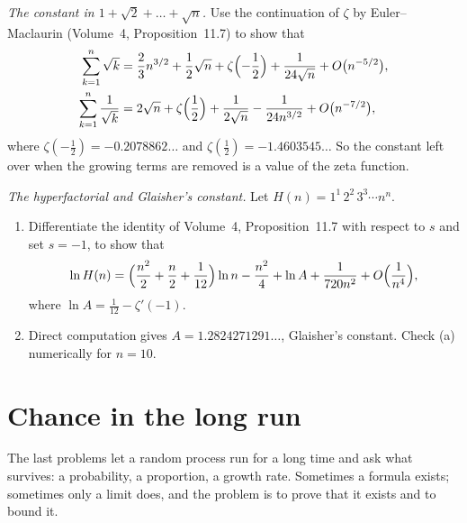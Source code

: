 \begin{exercise}[$\star\star$]\label{pb:sqrtsum}
\emph{The constant in $1+\sqrt2+\dots+\sqrt n$.} Use the continuation of $\zeta$ by Euler--Maclaurin (Volume~4, Proposition~11.7) to show that
\[
\begin{aligned}\sum_{k=1}^n\sqrt k&=\frac23n^{3/2}+\frac12\sqrt n+\zeta\Bigl(-\frac12\Bigr)+\frac1{24\sqrt n}+O\bigl(n^{-5/2}\bigr),\\
\sum_{k=1}^n\frac1{\sqrt k}&=2\sqrt n+\zeta\Bigl(\frac12\Bigr)+\frac1{2\sqrt n}-\frac1{24n^{3/2}}+O\bigl(n^{-7/2}\bigr),\end{aligned}
\]
where $\zeta(-\frac12)=-0.2078862\ldots$ and $\zeta(\frac12)=-1.4603545\ldots$ So the constant left over when the growing terms are removed is a value of the zeta function.
\end{exercise}

\begin{exercise}[$\star\star\star$]\label{pb:hyperfactorial}
\emph{The hyperfactorial and Glaisher's constant.} Let $H(n)=1^1\,2^2\,3^3\cdots n^n$.
\begin{enumerate}[label=(\alph*)]
\item Differentiate the identity of Volume~4, Proposition~11.7 with respect to $s$ and set $s=-1$, to show that
\[
\ln H(n)=\Bigl(\frac{n^2}2+\frac n2+\frac1{12}\Bigr)\ln n-\frac{n^2}4+\ln A+\frac1{720n^2}+O\Bigl(\frac1{n^4}\Bigr),
\]
where $\ln A=\frac1{12}-\zeta'(-1)$.
\item Direct computation gives $A=1.2824271291\ldots$, Glaisher's constant. Check (a) numerically for $n=10$.
\end{enumerate}
\end{exercise}

\section{Chance in the long run}

The last problems let a random process run for a long time and ask what survives: a probability, a proportion, a growth rate.
Sometimes a formula exists; sometimes only a limit does, and the problem is to prove that it exists and to bound it.

